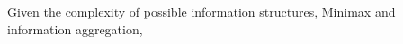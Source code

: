 Given the complexity of possible information structures,
Minimax and information aggregation, 








